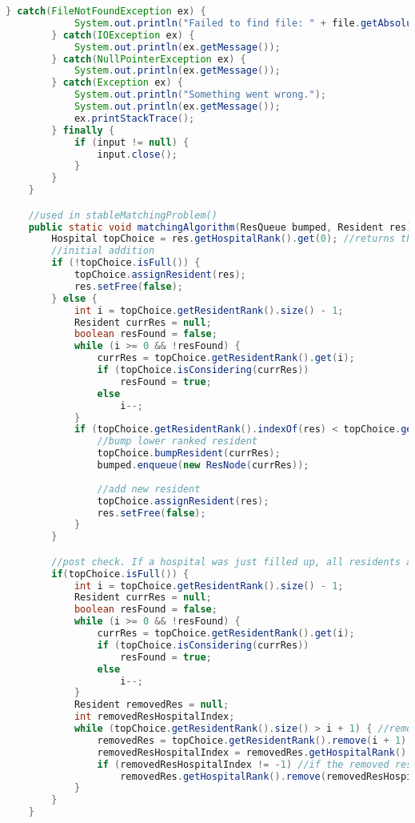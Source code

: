 \documentclass[letterpaper, 10pt,DIV=13]{scrartcl}
\numberwithin{equation}{section} %
\numberwithin{figure}{section} %
\numberwithin{table}{section} %
\begin{document}
\begin{lstlisting}[frame=single, language=java, breaklines]
        } catch(FileNotFoundException ex) {
            System.out.println("Failed to find file: " + file.getAbsolutePath());
        } catch(IOException ex) {
            System.out.println(ex.getMessage());
        } catch(NullPointerException ex) {
            System.out.println(ex.getMessage());
        } catch(Exception ex) {
            System.out.println("Something went wrong.");
            System.out.println(ex.getMessage());
            ex.printStackTrace();
        } finally {
            if (input != null) {
                input.close();
            }
        }
    }

    //used in stableMatchingProblem()
    public static void matchingAlgorithm(ResQueue bumped, Resident res) {
        Hospital topChoice = res.getHospitalRank().get(0); //returns the current top available choice of the resident
        //initial addition
        if (!topChoice.isFull()) {
            topChoice.assignResident(res);
            res.setFree(false);
        } else {
            int i = topChoice.getResidentRank().size() - 1;
            Resident currRes = null;
            boolean resFound = false;
            while (i >= 0 && !resFound) {
                currRes = topChoice.getResidentRank().get(i);
                if (topChoice.isConsidering(currRes))    
                    resFound = true;
                else
                    i--;
            }
            if (topChoice.getResidentRank().indexOf(res) < topChoice.getResidentRank().indexOf(currRes)) { //ensures that the new resident is ranked higher before bumping the old resident
                //bump lower ranked resident
                topChoice.bumpResident(currRes);
                bumped.enqueue(new ResNode(currRes));
                
                //add new resident
                topChoice.assignResident(res);
                res.setFree(false);
            }
        }

        //post check. If a hospital was just filled up, all residents after its last ranked resident being considered are dropped from the running.
        if(topChoice.isFull()) {
            int i = topChoice.getResidentRank().size() - 1;
            Resident currRes = null;
            boolean resFound = false;
            while (i >= 0 && !resFound) {
                currRes = topChoice.getResidentRank().get(i);
                if (topChoice.isConsidering(currRes))    
                    resFound = true;
                else
                    i--;
            }
            Resident removedRes = null;
            int removedResHospitalIndex;
            while (topChoice.getResidentRank().size() > i + 1) { //removes all elements in the list after index i
                removedRes = topChoice.getResidentRank().remove(i + 1);
                removedResHospitalIndex = removedRes.getHospitalRank().indexOf(topChoice);
                if (removedResHospitalIndex != -1) //if the removed resident has the hospital in its rankings, remove it
                    removedRes.getHospitalRank().remove(removedResHospitalIndex);
            }
        }
    }


\end{lstlisting}
\end{document}
